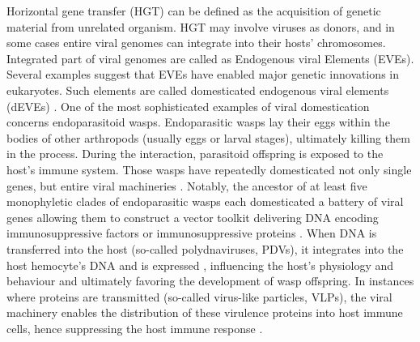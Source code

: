 Horizontal gene transfer (HGT) can be defined as the acquisition of genetic material from unrelated organism. HGT may involve viruses as donors, and in some cases entire viral genomes can integrate into their hosts' chromosomes. Integrated part of viral genomes are called as Endogenous viral Elements (EVEs). Several examples suggest that EVEs have enabled major genetic innovations in eukaryotes. Such elements are called domesticated endogenous viral elements (dEVEs) \citep{gasmi_horizontally_2021,yan_origin_2009,suzuki_non-retroviral_2020,parker_laterally_2019}. One of the most sophisticated examples of viral domestication concerns endoparasitoid wasps. Endoparasitic wasps lay their eggs within the bodies of other arthropods (usually eggs or larval stages), ultimately killing them in the process. During the interaction, parasitoid offspring is exposed to the host's immune system. Those wasps have repeatedly domesticated not only single genes, but entire viral machineries \citep{burke_common_2019}. Notably, the ancestor of at least five monophyletic clades of endoparasitic wasps each domesticated a battery of viral genes allowing them to construct a vector toolkit delivering DNA encoding immunosuppressive factors or immunosuppressive proteins {\citep{bezier_polydnaviruses_2009,volkoff_analysis_2010,pichon_recurrent_2015,burke_common_2019,di_giovanni_behavior-manipulating_2020}}. When DNA is transferred into the host (so-called polydnaviruses, PDVs), it integrates into the host hemocyte's DNA and is expressed \citep{chevignon_functional_2014, muller_genome-wide_2021}, influencing the host's physiology and behaviour and ultimately favoring the development of wasp offspring. In instances where proteins are transmitted (so-called virus-like particles, VLPs), the viral machinery enables the distribution of these virulence proteins into host immune cells, hence suppressing the host immune response \citep{colinet_convergent_2007}.\\ 

